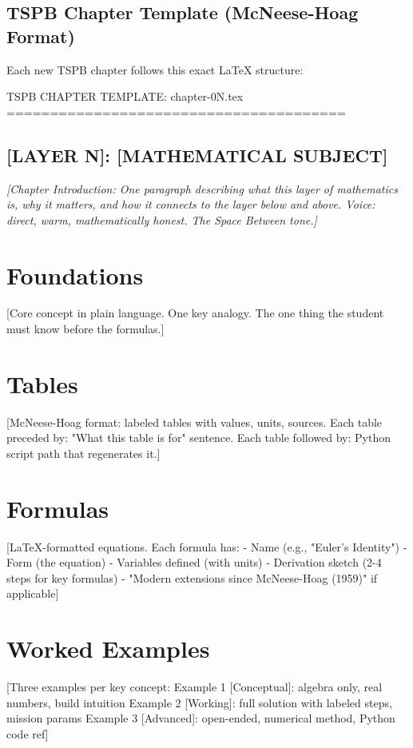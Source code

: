 \documentclass[11pt,letterpaper]{article}
\begin{document}
\subsection{TSPB Chapter Template (McNeese-Hoag Format)}

Each new TSPB chapter follows this exact LaTeX structure:

\begin{asciibox}
TSPB CHAPTER TEMPLATE: chapter-0N.tex
=======================================

\subsection*{[LAYER N]: [MATHEMATICAL SUBJECT]}

\textit{[Chapter Introduction: One paragraph describing what this layer of mathematics is,
why it matters, and how it connects to the layer below and above.
Voice: direct, warm, mathematically honest. The Space Between tone.]}

\section{Foundations}
  [Core concept in plain language. One key analogy. The one
   thing the student must know before the formulas.]

\section{Tables}
  [McNeese-Hoag format: labeled tables with values, units, sources.
   Each table preceded by: "What this table is for" sentence.
   Each table followed by: Python script path that regenerates it.]

\section{Formulas}
  [LaTeX-formatted equations. Each formula has:
   - Name (e.g., "Euler's Identity")
   - Form (the equation)
   - Variables defined (with units)
   - Derivation sketch (2-4 steps for key formulas)
   - "Modern extensions since McNeese-Hoag (1959)" if applicable]

\section{Worked Examples}
  [Three examples per key concept:
   Example 1 [Conceptual]: algebra only, real numbers, build intuition
   Example 2 [Working]: full solution with labeled steps, mission params
   Example 3 [Advanced]: open-ended, numerical method, Python code ref]


\end{asciibox}
\end{document}
